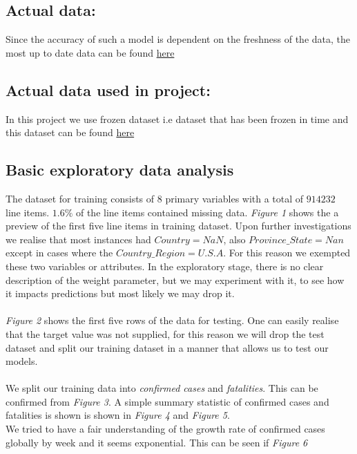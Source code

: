 \documentclass{article}
\begin{document}
\subsection{Actual data:}
Since the accuracy of such a model is dependent on the freshness of the data, the most up to date data can be found \href{https://www.kaggle.com/c/covid19-global-forecasting-week-5/overview}{here}

\subsection{Actual data used in project:}
In this project we use frozen dataset i.e dataset that has been frozen in time and this dataset can be found \href{https://github.com/acquayefrank/MLDM2020-Project/tree/master/data}{here}

\subsection{Basic exploratory data analysis}
The dataset for training consists of $8$ primary variables with a total of $914232$ line items. $1.6\%$  of the line items contained missing data. \emph{Figure 1} shows the a preview of the first five line items in training dataset.  Upon further investigations we realise that most instances had $Country = NaN$, also $Province\_State = Nan$ except in cases where the $Country\_Region = U.S.A$. For this reason we exempted these two variables or attributes. In the exploratory stage, there is no clear description of the weight parameter, but we may experiment with it, to see how it impacts predictions but most likely we may drop it. 
\\
\\
 \emph{Figure 2} shows the first five rows of the data for testing. One can easily realise that the target value was not supplied, for this reason we will drop the test dataset and split our training dataset in a manner that allows us to test our models.
 \\
 \\
 We split our training data into \emph{confirmed cases} and  \emph{fatalities}. This can be confirmed from  \emph{Figure 3}. 
 A simple summary statistic of confirmed cases and fatalities is shown is shown in \emph{Figure 4} and \emph{Figure 5}.
 \\
 We tried to have a fair understanding of the growth rate of confirmed cases globally by week and it seems exponential. This can be seen if   \emph{Figure 6}
 
\end{document}
